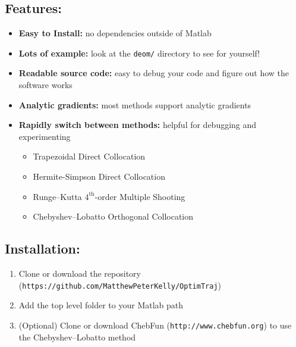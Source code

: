 \subsection{Features:}
\begin{itemize} \setlength\itemsep{-0.1em}
\item {\bf Easy to Install: } no dependencies outside of Matlab \footnotemark
\item {\bf Lots of example: } look at the \texttt{deom/} directory to see for yourself!
\item {\bf Readable source code: } easy to debug your code and figure out how the software works
\item {\bf Analytic gradients: } most methods support analytic gradients
\item {\bf Rapidly switch between methods: } helpful for debugging and experimenting
 	\begin{itemize} \setlength\itemsep{-0.1em}
 	\item Trapezoidal Direct Collocation
 	\item Hermite-Simpson Direct Collocation
 	\item Runge--Kutta $4^\text{th}$-order Multiple Shooting
 	\item Chebyshev--Lobatto Orthogonal Collocation 
 	\end{itemize}
\end{itemize}

\subsection{Installation:}
\begin{enumerate} \setlength\itemsep{-0.1em}
\item Clone or download the repository (\texttt{https://github.com/MatthewPeterKelly/OptimTraj})
\item Add the top level folder to your Matlab path
\item (Optional) Clone or download ChebFun (\texttt{http://www.chebfun.org}) to use the Chebyshev--Lobatto method
\end{enumerate}

